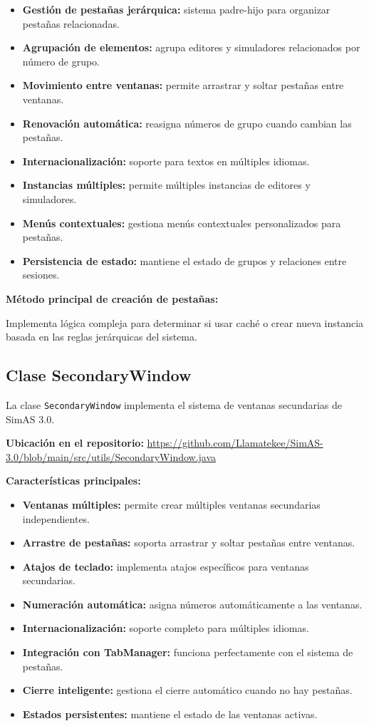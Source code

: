 \begin{itemize}
    \item \textbf{Gestión de pestañas jerárquica:} sistema padre-hijo para organizar pestañas relacionadas.
    \item \textbf{Agrupación de elementos:} agrupa editores y simuladores relacionados por número de grupo.
    \item \textbf{Movimiento entre ventanas:} permite arrastrar y soltar pestañas entre ventanas.
    \item \textbf{Renovación automática:} reasigna números de grupo cuando cambian las pestañas.
    \item \textbf{Internacionalización:} soporte para textos en múltiples idiomas.
    \item \textbf{Instancias múltiples:} permite múltiples instancias de editores y simuladores.
    \item \textbf{Menús contextuales:} gestiona menús contextuales personalizados para pestañas.
    \item \textbf{Persistencia de estado:} mantiene el estado de grupos y relaciones entre sesiones.
\end{itemize}

\textbf{Método principal de creación de pestañas:}

Implementa lógica compleja para determinar si usar caché o crear nueva instancia basada en las reglas jerárquicas del sistema.

\subsection{Clase SecondaryWindow}

La clase \texttt{SecondaryWindow} implementa el sistema de ventanas secundarias de SimAS 3.0.

\textbf{Ubicación en el repositorio:} \url{https://github.com/Llamatekee/SimAS-3.0/blob/main/src/utils/SecondaryWindow.java}

\textbf{Características principales:}

\begin{itemize}
    \item \textbf{Ventanas múltiples:} permite crear múltiples ventanas secundarias independientes.
    \item \textbf{Arrastre de pestañas:} soporta arrastrar y soltar pestañas entre ventanas.
    \item \textbf{Atajos de teclado:} implementa atajos específicos para ventanas secundarias.
    \item \textbf{Numeración automática:} asigna números automáticamente a las ventanas.
    \item \textbf{Internacionalización:} soporte completo para múltiples idiomas.
    \item \textbf{Integración con TabManager:} funciona perfectamente con el sistema de pestañas.
    \item \textbf{Cierre inteligente:} gestiona el cierre automático cuando no hay pestañas.
    \item \textbf{Estados persistentes:} mantiene el estado de las ventanas activas.
\end{itemize}

